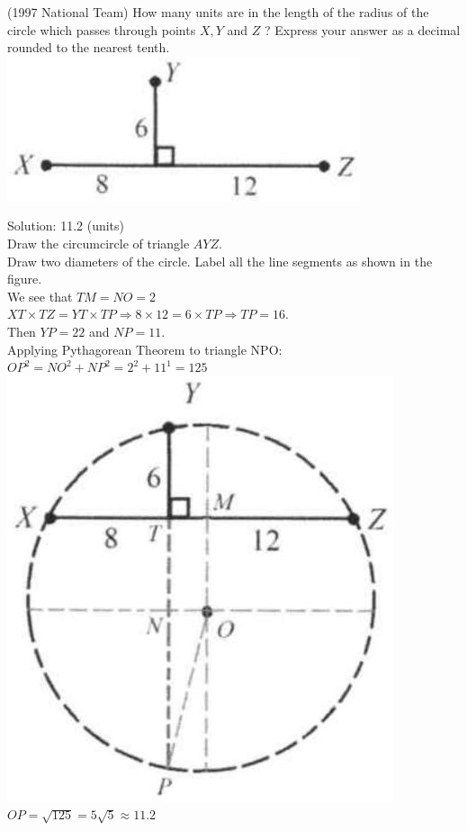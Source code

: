 \documentclass{article}
\begin{document}
(1997 National Team) How many units are in the length of the radius of the circle which passes through points \(X, Y\) and \(Z\) ? Express your answer as a decimal rounded to the nearest tenth.\\
\centering
\includegraphics[width=\textwidth]{images/204.jpg}

Solution: 11.2 (units)\\
Draw the circumcircle of triangle \(A Y Z\).\\
Draw two diameters of the circle. Label all the line segments as shown in the figure.\\
We see that \(T M=N O=2\)\\
\(X T \times T Z=Y T \times T P \Rightarrow 8 \times 12=6 \times T P \Rightarrow T P=16\).\\
Then \(Y P=22\) and \(N P=11\).\\
Applying Pythagorean Theorem to triangle NPO:\\
\(O P^{2}=N O^{2}+N P^{2}=2^{2}+11^{1}=125\)\\
\includegraphics[width=\textwidth]{images/204(3).jpg} \(O P=\sqrt{125}=5 \sqrt{5} \approx 11.2\)
\end{document}
